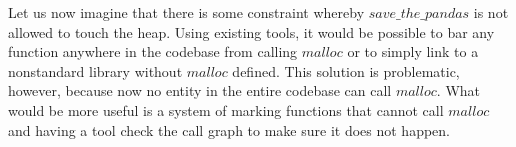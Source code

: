 Let us now imagine that there is some constraint whereby $save\_the\_pandas$ is not allowed to touch the heap.  Using existing tools, it would be possible to bar any function anywhere in the codebase from calling $malloc$ or to simply link to a nonstandard library without $malloc$ defined.  This solution is problematic, however, because now no entity in the entire codebase can call $malloc$.  What would be more useful is a system of marking functions that cannot call $malloc$ and having a tool check the call graph to make sure it does not happen.  


